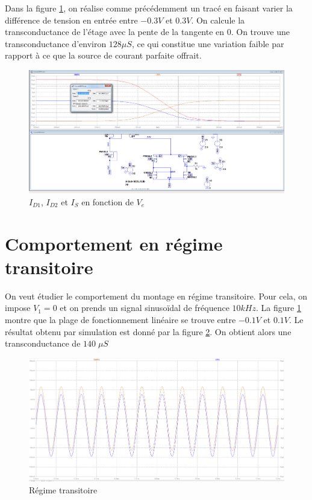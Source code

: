 \documentclass[french]{article}
\begin{document}
\FloatBarrier

 Dans la figure \ref{transcond2}, on réalise comme précédemment un tracé en faisant varier la différence de tension en entrée entre $-0.3 V$ et $0.3 V$. On calcule la transconductance de l'étage avec la pente de la tangente en 0. On trouve une transconductance d'environ $128 \mu S$, ce qui constitue une variation faible par rapport à ce que la source de courant parfaite offrait.

\begin{figure}[h!]
\includegraphics[width=\textwidth]{images/gmPincement222.PNG}
\caption{$I_{D1}$, $I_{D2}$ et $I_S$ en fonction de $V_e$}
\label{transcond2}
\end{figure}

\section{ Comportement en régime transitoire}
On veut étudier le comportement du montage en régime transitoire.
Pour cela, on impose $V_1=0$ et on prends un signal sinusoïdal de fréquence $10 kHz$. La figure \ref{transcond2} montre que la plage de fonctionnement linéaire se trouve entre $-0.1V$ et $0.1V$. Le résultat obtenu par simulation est donné par la figure \ref{transitoire}. On obtient alors une transconductance de $140 \; \mu S$

\begin{figure}[h!]
\includegraphics[width=\textwidth]{images/TransitoireLineaire.PNG}
\caption{Régime transitoire}
\label{transitoire}
\end{figure}
\end{document}
